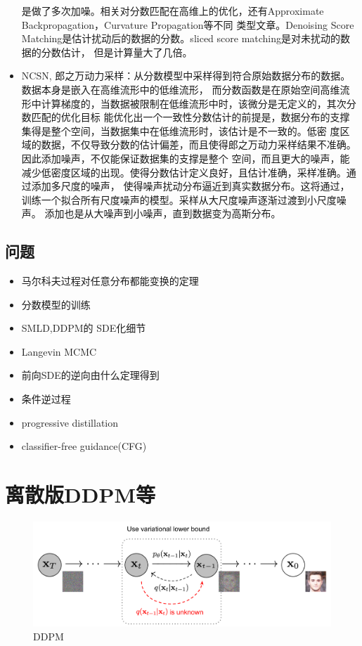 \documentclass[lang=cn,newtx,10pt,scheme=chinese]{elegantbook}
\begin{document}
\begin{itemize}
  是做了多次加噪。相关对分数匹配在高维上的优化，还有Approximate Backpropagation，Curvature  Propagation等不同
  类型文章。Denoising Score Matching是估计扰动后的数据的分数。sliced score matching是对未扰动的数据的分数估计，
  但是计算量大了几倍。
  \item NCSN, 郎之万动力采样：从分数模型中采样得到符合原始数据分布的数据。数据本身是嵌入在高维流形中的低维流形，
  而分数函数是在原始空间高维流形中计算梯度的，当数据被限制在低维流形中时，该微分是无定义的，其次分数匹配的优化目标
  能优化出一个一致性分数估计的前提是，数据分布的支撑集得是整个空间，当数据集中在低维流形时，该估计是不一致的。低密
  度区域的数据，不仅导致分数的估计偏差，而且使得郎之万动力采样结果不准确。因此添加噪声，不仅能保证数据集的支撑是整个
  空间，而且更大的噪声，能减少低密度区域的出现。使得分数估计定义良好，且估计准确，采样准确。通过添加多尺度的噪声，
  使得噪声扰动分布逼近到真实数据分布。这将通过，训练一个拟合所有尺度噪声的模型。采样从大尺度噪声逐渐过渡到小尺度噪声。
  添加也是从大噪声到小噪声，直到数据变为高斯分布。

\end{itemize}

\subsection{问题}
\begin{itemize}
    \item 马尔科夫过程对任意分布都能变换的定理
    \item 分数模型的训练
    \item SMLD,DDPM的 SDE化细节
    \item  Langevin MCMC
    \item 前向SDE的逆向由什么定理得到
    \item 条件逆过程
    \item progressive distillation
    \item classifier-free guidance(CFG)
\end{itemize}


\section{离散版DDPM等}
\begin{figure}[h!]
\centering
\includegraphics[scale=0.15]{image/DDPM.png}
\caption{DDPM}
\label{fig:DDPM}
\end{figure}
\end{document}
